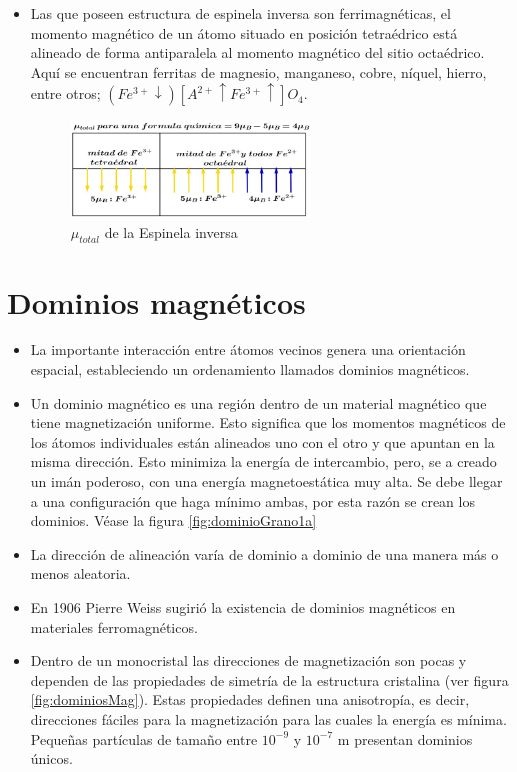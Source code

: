 \begin{itemize}
	\item Las que poseen estructura de espinela inversa son ferrimagnéticas, el momento magnético de un átomo situado en posición tetraédrico está alineado de forma antiparalela al momento magnético del sitio octaédrico. Aquí se encuentran ferritas de magnesio, manganeso, cobre, níquel, hierro, entre otros; ${(Fe^{3+}\downarrow)[A^{2+}\uparrow Fe^{3+}\uparrow]O_{4}}$.

\begin{figure}[H]
    \centering
    \includegraphics[width=0.6\textwidth]{./Figures/espinela2}
	\caption{$\mu_{total}$ de la Espinela inversa}
	\label{fig:espinela2}
\end{figure}

\end{itemize}

\section{Dominios magnéticos}

\begin{itemize}
	\item La importante interacción entre átomos vecinos genera una orientación espacial, estableciendo un ordenamiento llamados dominios magnéticos.
	
	\item	Un dominio magnético es una región dentro de un material magnético que tiene magnetización uniforme. Esto significa que los momentos magnéticos de los átomos individuales están alineados uno con el otro y que apuntan en la misma dirección. Esto minimiza la energía de intercambio, pero, se a creado un imán poderoso, con una energía magnetoestática muy alta. Se debe llegar a una configuración que haga mínimo ambas, por esta razón se crean los dominios. Véase la figura \ref{fig:dominioGrano1a}

	\item La dirección de alineación varía de dominio a dominio de una manera más o menos aleatoria.
	
	\item En 1906 Pierre Weiss sugirió la existencia de dominios magnéticos en materiales ferromagnéticos.
	
	\item Dentro de un monocristal las direcciones de magnetización son pocas y dependen de las propiedades de simetría de la estructura cristalina (ver figura \ref{fig:dominiosMag}). Estas propiedades definen una anisotropía, es decir, direcciones fáciles para la magnetización para las cuales la energía es mínima. Pequeñas partículas de tamaño entre $10^{-9}$ y $10^{-7}$ m presentan dominios únicos.
 
\end{itemize}


